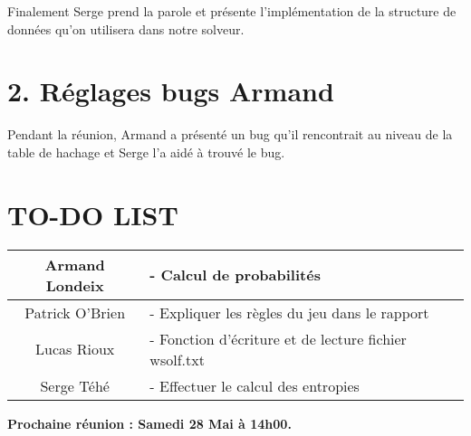 Finalement Serge prend la parole et présente l'implémentation de la structure de données qu'on utilisera dans notre solveur.

\section*{2. Réglages bugs Armand}
Pendant la réunion, Armand a présenté un bug qu'il rencontrait au niveau de la table de hachage et Serge l'a aidé à trouvé le bug.

\section*{TO-DO LIST}

\begin{center}
\begin{tabular}{|c|l|}
    \hline
    Armand Londeix & - Calcul de probabilités \\
    \hline
    Patrick O'Brien 
    & - Expliquer les règles du jeu dans le rapport \\
    \hline
    Lucas Rioux & - Fonction d'écriture et de lecture fichier wsolf.txt  \\
    \hline
    Serge Téhé & - Effectuer le calcul des entropies \\
    \hline
\end{tabular}
\end{center}

\tabto{0cm}\textbf{Prochaine réunion : Samedi 28 Mai à 14h00.}